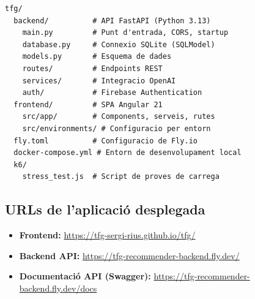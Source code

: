 \documentclass[12pt,a4paper]{article}
\begin{document}
\begin{lstlisting}[numbers=none]
tfg/
  backend/          # API FastAPI (Python 3.13)
    main.py         # Punt d'entrada, CORS, startup
    database.py     # Connexio SQLite (SQLModel)
    models.py       # Esquema de dades
    routes/         # Endpoints REST
    services/       # Integracio OpenAI
    auth/           # Firebase Authentication
  frontend/         # SPA Angular 21
    src/app/        # Components, serveis, rutes
    src/environments/ # Configuracio per entorn
  fly.toml          # Configuracio de Fly.io
  docker-compose.yml # Entorn de desenvolupament local
  k6/
    stress_test.js  # Script de proves de carrega
\end{lstlisting}

\subsection{URLs de l'aplicació desplegada}

\begin{itemize}
    \item \textbf{Frontend:} \url{https://tfg-sergi-rius.github.io/tfg/}
    \item \textbf{Backend API:} \url{https://tfg-recommender-backend.fly.dev/}
    \item \textbf{Documentació API (Swagger):} \url{https://tfg-recommender-backend.fly.dev/docs}
\end{itemize}
\end{document}
